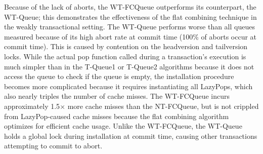 Because of the lack of aborts, the WT-FCQueue outperforms its counterpart, the WT-Queue; this demonstrates the effectiveness of the flat combining technique in the weakly transactional setting. The WT-Queue performs worse than all queues measured because of its high abort rate at commit time (100\% of aborts occur at commit time). This is caused by contention on the headversion and tailversion locks. While the actual pop function called during a transaction's execution is much simpler than in the T-Queue1 or T-Queue2 algorithms because it does not access the queue to check if the queue is empty, the installation procedure becomes more complicated because it requires instantiating all LazyPops, which also nearly triples the number of cache misses. The WT-FCQueue incurs approximately 1.5$\times$ more cache misses than the NT-FCQueue, but is not crippled from LazyPop-caused cache misses because the flat combining algorithm optimizes for efficient cache usage. Unlike the WT-FCQueue, the WT-Queue holds a global lock during installation at commit time, causing other transactions attempting to commit to abort.

